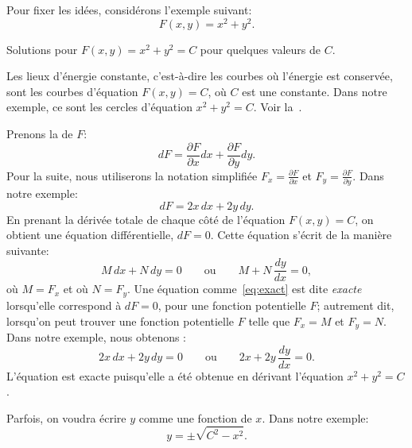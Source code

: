 Pour fixer les idées, considérons l'exemple suivant:
\begin{equation*}
	F(x,y) = x^2+y^2 .
\end{equation*}

\begin{mywrapfig}[17]{3.25in}
	\capstart {}
	\caption{Solutions pour $F(x,y) = x^2+y^2 = C$ pour quelques valeurs de $C$.\label{exact:circlesfig}}
\end{mywrapfig}
Les lieux d'énergie constante, c'est-à-dire les courbes où l'énergie est conservée, sont les courbes d'équation $F(x,y) = C$,
où $C$ est une constante.  Dans notre exemple, ce sont les cercles d'équation $x^2+y^2=C$.
Voir  la~.

Prenons la \emph{} de $F$:
\begin{equation*}
	dF = \frac{\partial F}{\partial x} dx + \frac{\partial F}{\partial y} dy .
\end{equation*}
Pour la suite, nous utiliserons la notation simplifiée
	$F_x = \frac{\partial F}{\partial x}$ et
	$F_y = \frac{\partial F}{\partial y}$.
Dans notre exemple:
\begin{equation*}
	dF = 2x \, dx + 2y \, dy .
\end{equation*}
En prenant la dérivée totale de chaque côté de l'équation $F(x,y) = C$, on obtient une équation différentielle,  $dF = 0$.
Cette équation s'écrit de la manière suivante:
\begin{equation}\label{eq:exact}
	M \, dx + N \, dy = 0 \qquad \text{ou} \qquad	M + N \, \frac{dy}{dx} = 0,
\end{equation}
où $M=F_x$ et où $N=F_y$.  Une équation comme~\eqref{eq:exact} est dite \emph{exacte} lorsqu'elle correspond à $dF = 0$,
pour une fonction potentielle $F$; autrement dit, lorsqu'on peut trouver une fonction potentielle $F$ telle que $F_x=M$ et $F_y=N$.
Dans notre exemple, nous obtenons :
\begin{equation*}
	2x \, dx + 2y \, dy = 0 \qquad 	\text{ou} \qquad  2x + 2y \, \frac{dy}{dx} = 0 .
\end{equation*}
L'équation est exacte puisqu'elle a été obtenue en dérivant l'équation $x^2+y^2=C$.

Parfois, on voudra écrire $y$ comme une fonction de $x$.  Dans notre exemple:
\begin{equation*}
	y = \pm \sqrt{C^2-x^2} .
\end{equation*}

